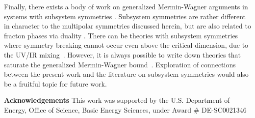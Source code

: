 \documentclass[pra,aps,twocolumn, amsfonts,amsmath,amssymb,nofootinbib,superscriptaddress]{revtex4}
\begin{document}
Finally, there exists a body of work on generalized Mermin-Wagner arguments in systems with subsystem symmetries \cite{Batista2005, SeibergA, SeibergB, SeibergC, Gorantla2021, Distler2021}. Subsystem symmetries are rather different in character to the multipolar symmetries discussed herein, but are also related to fracton phases via duality \cite{VHF2}. There can be theories with subsystem symmetries where symmetry breaking cannot occur even above the critical dimension, due to the UV/IR mixing~\cite{Gorantla2021}. However, it is always possible to write down theories that saturate the generalized Mermin-Wagner bound~\cite{Distler2021}.
Exploration of connections between the present work and the literature on subsystem symmetries would also be a fruitful topic for future work. 

{\bf Acknowledgements} This work was supported by
the U.S. Department of Energy, Office of Science, Basic
Energy Sciences, under Award \# DE-SC0021346


\end{document}
